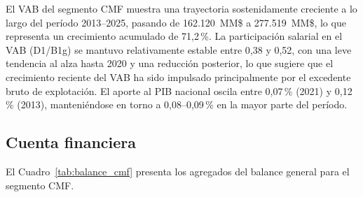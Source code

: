 El VAB del segmento CMF muestra una trayectoria sostenidamente
creciente a lo largo del período 2013--2025, pasando de
162.120~MM\$ a 277.519~MM\$, lo que representa un crecimiento
acumulado de 71,2\,\%. La participación salarial en el VAB
(D1/B1g) se mantuvo relativamente estable entre 0{,}38 y
0{,}52, con una leve tendencia al alza hasta 2020 y una
reducción posterior, lo que sugiere que el crecimiento reciente
del VAB ha sido impulsado principalmente por el excedente
bruto de explotación. El aporte al PIB nacional oscila entre
0,07\,\% (2021) y 0,12\,\% (2013), manteniéndose en torno
a 0,08--0,09\,\% en la mayor parte del período.

\subsection{Cuenta financiera}
\label{subsec:financiera-cmf}
El Cuadro~\ref{tab:balance_cmf} presenta los agregados del
balance general para el segmento CMF.

